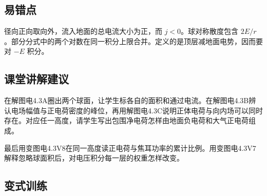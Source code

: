 \documentclass[UTF8,fontset=fandol,a4paper,11pt]{ctexart}
\begin{document}


\subsection*{易错点}

径向正向取向外，流入地面的总电流大小为正，而 $j<0$。球对称散度包含 $2E/r$。部分分式中的两个对数在同一积分上限合并。定义的是顶层减地面电势，因而要对 $-E$ 积分。



\subsection*{课堂讲解建议}

在解图电4.3A圈出两个球面，让学生标各自的面积和通过电流。在解图电4.3B辨认电场幅值与正电荷密度的峰位，再用解图电4.3C说明正体电荷与向内场可以同时存在。对应任一高度，请学生写出包围净电荷怎样由地面负电荷和大气正电荷组成。

最后用变图电4.3V8在同一高度读正电荷与焦耳功率的累计比例。用变图电4.3V7解释忽略球面积后，对电压积分每一层的权重怎样改变。


\subsection*{变式训练}
\end{document}

